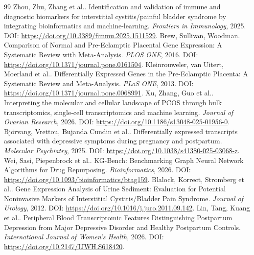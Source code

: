 \begin{thebibliography}{99}
 Zhou, Zhu, Zhang et al.. Identification and validation of immune and diagnostic biomarkers for interstitial cystitis/painful bladder syndrome by integrating bioinformatics and machine-learning. \emph{Frontiers in Immunology}, 2025. DOI: \url{https://doi.org/10.3389/fimmu.2025.1511529}.
 Brew, Sullivan, Woodman. Comparison of Normal and Pre-Eclamptic Placental Gene Expression: A Systematic Review with Meta-Analysis. \emph{PLOS ONE}, 2016. DOI: \url{https://doi.org/10.1371/journal.pone.0161504}.
 Kleinrouweler, van Uitert, Moerland et al.. Differentially Expressed Genes in the Pre-Eclamptic Placenta: A Systematic Review and Meta-Analysis. \emph{PLoS ONE}, 2013. DOI: \url{https://doi.org/10.1371/journal.pone.0068991}.
 Xu, Zhang, Guo et al.. Interpreting the molecular and cellular landscape of PCOS through bulk transcriptomics, single-cell transcriptomics and machine learning. \emph{Journal of Ovarian Research}, 2026. DOI: \url{https://doi.org/10.1186/s13048-025-01956-0}.
 Björvang, Vrettou, Bujanda Cundin et al.. Differentially expressed transcripts associated with depressive symptoms during pregnancy and postpartum. \emph{Molecular Psychiatry}, 2025. DOI: \url{https://doi.org/10.1038/s41380-025-03068-z}.
 Wei, Sasi, Piepenbrock et al.. KG-Bench: Benchmarking Graph Neural Network Algorithms for Drug Repurposing. \emph{Bioinformatics}, 2026. DOI: \url{https://doi.org/10.1093/bioinformatics/btag159}.
 Blalock, Korrect, Stromberg et al.. Gene Expression Analysis of Urine Sediment: Evaluation for Potential Noninvasive Markers of Interstitial Cystitis/Bladder Pain Syndrome. \emph{Journal of Urology}, 2012. DOI: \url{https://doi.org/10.1016/j.juro.2011.09.142}.
 Lin, Tang, Kuang et al.. Peripheral Blood Transcriptomic Features Distinguishing Postpartum Depression from Major Depressive Disorder and Healthy Postpartum Controls. \emph{International Journal of Women's Health}, 2026. DOI: \url{https://doi.org/10.2147/IJWH.S618420}.
\end{thebibliography}
